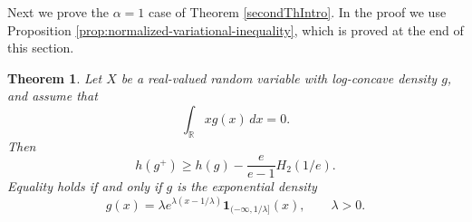 \documentclass{article}
\theoremstyle{plain}
\newtheorem{theorem}{Theorem}
\theoremstyle{definition}
\newcommand{\1}{\mathbf 1}
\begin{document}




Next we prove the $\alpha = 1$ case of Theorem \ref{secondThIntro}. In the proof we use Proposition \ref{prop:normalized-variational-inequality}, which is proved at the end of this section. 
\begin{theorem}
\label{thm:sharp-reverse-grunbaum-shannon}
Let \(X\) be a real-valued random variable with log-concave density \(g\), and assume that
\[
        \int_{\mathbb R} xg(x)\,dx=0.
\]
Then
\[
        h(g^+)
        \ge
        h(g)-\frac{e}{e-1}H_2(1/e).
\]
Equality holds if and only if $g$ is the exponential density
\[
        g(x)=\lambda e^{\lambda(x-1/\lambda)}
        \mathbf 1_{(-\infty,1/\lambda]}(x),
        \qquad \lambda>0.
\]
\end{theorem}

\end{document}
